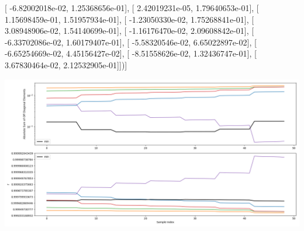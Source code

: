 \documentclass{article}
\begin{document}
       [ -6.82002018e-02,   1.25368656e-01],
       [  2.42019231e-05,   1.79640653e-01],
       [  1.15698459e-01,   1.51957934e-01],
       [ -1.23050330e-02,   1.75268841e-01],
       [  3.08948906e-02,   1.54140699e-01],
       [ -1.16176470e-02,   2.09608842e-01],
       [ -6.33702086e-02,   1.60179407e-01],
       [ -5.58320546e-02,   6.65022897e-02],
       [ -6.65254669e-02,   4.45156427e-02],
       [ -8.51558626e-02,   1.32436747e-01],
       [  3.67830464e-02,   2.12532905e-01]])]
\begin{center}
\includegraphics[scale=.9]{report_pickled_controls144/control_dpn_all.png}

\end{center}
\end{document}
